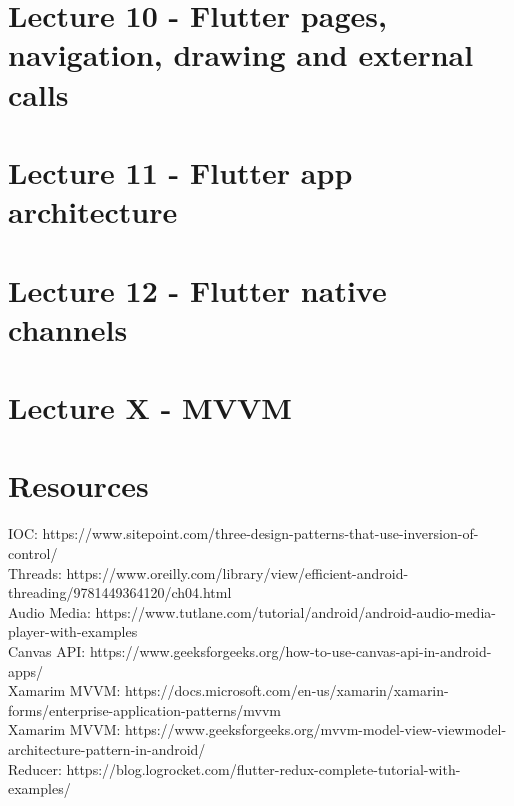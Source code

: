 \documentclass{article}
\begin{document}
    \section{Lecture 10 - Flutter pages, navigation, drawing and external calls}
    
    \section{Lecture 11 - Flutter app architecture}
    
    \newpage
    \section{Lecture 12 - Flutter native channels}
    
    \section{Lecture X - MVVM}
     
    \section{Resources}
    IOC: https://www.sitepoint.com/three-design-patterns-that-use-inversion-of-control/  \\
    Threads: https://www.oreilly.com/library/view/efficient-android-threading/9781449364120/ch04.html  \\
    Audio Media: https://www.tutlane.com/tutorial/android/android-audio-media-player-with-examples \\ 
    Canvas API: https://www.geeksforgeeks.org/how-to-use-canvas-api-in-android-apps/ \\ 
    Xamarim MVVM: https://docs.microsoft.com/en-us/xamarin/xamarin-forms/enterprise-application-patterns/mvvm \\ 
    Xamarim MVVM: https://www.geeksforgeeks.org/mvvm-model-view-viewmodel-architecture-pattern-in-android/ \\ 
    Reducer: https://blog.logrocket.com/flutter-redux-complete-tutorial-with-examples/ \\ 
\end{document}
